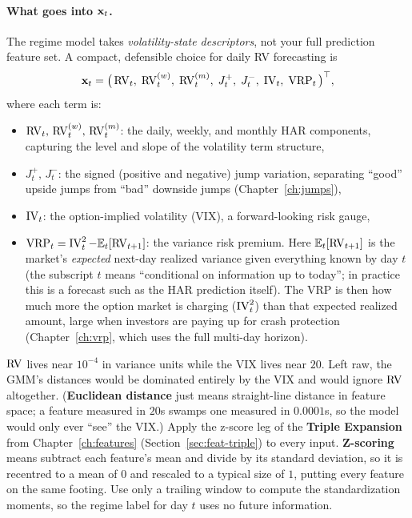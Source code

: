 \paragraph{What goes into $\mathbf{x}_t$.}
The regime model takes \emph{volatility-state descriptors}, not your full
prediction feature set.  A compact, defensible choice for daily
RV forecasting is
\begin{equation}\label{eq:hybrid:regime-inputs}
  \mathbf{x}_t = \bigl(\,\operatorname{RV}_t,\;\operatorname{RV}_t^{(w)},\;\operatorname{RV}_t^{(m)},\;
    J_t^{+},\;J_t^{-},\;\operatorname{IV}_t,\;\operatorname{VRP}_t\,\bigr)^\top,
\end{equation}
where each term is:
\begin{itemize}
  \item $\operatorname{RV}_t,\,\operatorname{RV}_t^{(w)},\,\operatorname{RV}_t^{(m)}$: the daily, weekly, and
        monthly HAR components, capturing the level and slope of the
        volatility term structure,
  \item $J_t^{+},\,J_t^{-}$: the signed (positive and negative) jump
        variation, separating ``good'' upside jumps from ``bad'' downside
        jumps (Chapter~\ref{ch:jumps}),
  \item $\operatorname{IV}_t$: the option-implied volatility (VIX), a
        forward-looking risk gauge,
  \item $\operatorname{VRP}_t = \operatorname{IV}_t^2 - \mathbb{E}_t[\operatorname{RV}_{t+1}]$: the variance risk
        premium.  Here $\mathbb{E}_t[\operatorname{RV}_{t+1}]$ is the market's \emph{expected}
        next-day realized variance given everything known by day $t$ (the
        subscript $t$ means ``conditional on information up to today''; in
        practice this is a forecast such as the HAR prediction itself). The
        VRP is then how much more the option market is charging
        ($\operatorname{IV}_t^2$) than that expected realized amount, large when
        investors are paying up for crash protection
        (Chapter~\ref{ch:vrp}, which uses the full multi-day horizon).
\end{itemize}

\begin{warning}
$\operatorname{RV}$ lives near $10^{-4}$ in variance units while the VIX lives near
$20$.  Left raw, the GMM's distances would be dominated entirely by the
VIX and would ignore $\operatorname{RV}$ altogether.  (\textbf{Euclidean distance} just
means straight-line distance in feature space; a feature measured in
$20$s swamps one measured in $0.0001$s, so the model would only ever
``see'' the VIX.)  Apply the z-score leg of the \textbf{Triple Expansion}
from Chapter~\ref{ch:features} (Section~\ref{sec:feat-triple}) to every
input.  \textbf{Z-scoring} means subtract each feature's mean and divide
by its standard deviation, so it is recentred to a mean of $0$ and
rescaled to a typical size of $1$, putting every feature on the same
footing.  Use only a trailing window to compute the standardization
moments, so the regime label for day $t$ uses no future information.
\end{warning}

